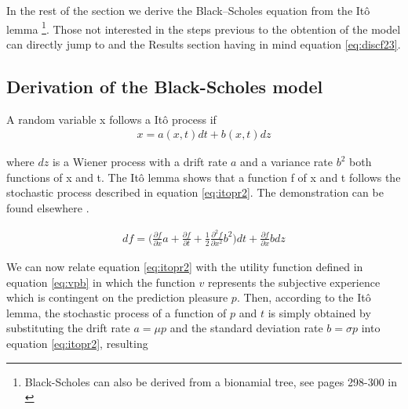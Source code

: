 \documentclass[11pt,twocolumn]{article}
\begin{document}
In the rest of the section we derive the Black–Scholes equation from the It\^{o} lemma \citep{ito_stochastic_1951} \footnote{ Black-Scholes can  also be derived from a bionamial tree, see pages 298-300 in \citep{hull_options_2011}}. Those not interested in the steps previous to the obtention of the model can directly jump to and the Results section having in mind equation \ref{eq:discf23}.

\subsection{Derivation of the Black-Scholes model}
\label{se:bsm}
A random variable x follows a It\^{o} process if 
\begin{equation*}
\begin{split}
   x = a(x,t)dt + b(x,t)dz
\end{split}
\label{eq:itopr}
\end{equation*}

where $dz$ is a Wiener process with a drift rate $a$ and a variance rate $b^2$ both functions of x and t. The It\^{o} lemma shows that a function f of x and t follows the stochastic process described in equation \ref{eq:itopr2}. The demonstration can be found elsewhere \citep{shreve_stochastic_2010}.

\begin{equation}
\begin{split}
   df = \bigg(\frac{\partial f}{\partial x} a  + \frac{\partial f}{\partial t} + \frac{1}{2}\frac{\partial ^2 f}{\partial x^2} b^2 \bigg)dt + \frac{\partial f}{\partial x}b dz
\end{split}
\label{eq:itopr2}
\end{equation}

We can now relate equation \ref{eq:itopr2} with the utility function defined in equation \ref{eq:vpb} in which the function $v$ represents the subjective experience which is contingent on the prediction pleasure $p$. Then, according to the  It\^{o} lemma, the stochastic process of a function of $p$ and $t$ is simply obtained by substituting the drift rate $a = \mu p$ and the standard deviation rate $b = \sigma p$ into equation \ref{eq:itopr2}, resulting 
\end{document}
